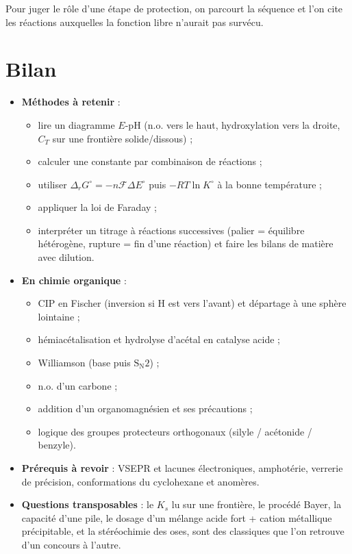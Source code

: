 \documentclass[11pt,a4paper]{article}
\providecommand{\tightlist}{\setlength{\itemsep}{0pt}\setlength{\parskip}{0pt}}
\begin{document}
\begin{methode}

Pour juger le rôle d'une étape de protection, on parcourt la séquence et l'on cite les réactions auxquelles la fonction libre n'aurait pas survécu.

\end{methode}

\hypertarget{bilan}{%
\section{Bilan}\label{bilan}}

\begin{itemize}
\tightlist
\item
  \textbf{Méthodes à retenir} :

  \begin{itemize}
  \tightlist
  \item
    lire un diagramme \(E\)-pH (n.o. vers le haut, hydroxylation vers la droite, \(C_T\) sur une frontière solide/dissous) ;
  \item
    calculer une constante par combinaison de réactions ;
  \item
    utiliser \(\Delta_rG^\circ=-n\mathcal F\Delta E^\circ\) puis \(-RT\ln K^\circ\) à la bonne température ;
  \item
    appliquer la loi de Faraday ;
  \item
    interpréter un titrage à réactions successives (palier = équilibre hétérogène, rupture = fin d'une réaction) et faire les bilans de matière avec dilution.
  \end{itemize}
\item
  \textbf{En chimie organique} :

  \begin{itemize}
  \tightlist
  \item
    CIP en Fischer (inversion si H est vers l'avant) et départage à une sphère lointaine ;
  \item
    hémiacétalisation et hydrolyse d'acétal en catalyse acide ;
  \item
    Williamson (base puis \(\mathrm{S_N2}\)) ;
  \item
    n.o. d'un carbone ;
  \item
    addition d'un organomagnésien et ses précautions ;
  \item
    logique des groupes protecteurs orthogonaux (silyle / acétonide / benzyle).
  \end{itemize}
\item
  \textbf{Prérequis à revoir} : VSEPR et lacunes électroniques, amphotérie, verrerie de précision, conformations du cyclohexane et anomères.
\item
  \textbf{Questions transposables} : le \(K_s\) lu sur une frontière, le procédé Bayer, la capacité d'une pile, le dosage d'un mélange acide fort + cation métallique précipitable, et la stéréochimie des oses, sont des classiques que l'on retrouve d'un concours à l'autre.
\end{itemize}
\end{document}
